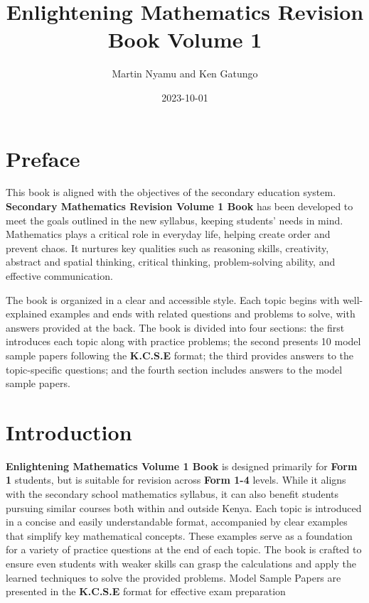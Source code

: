 \documentclass[
  a4paperpaper,
]{scrbook}
\title{Enlightening Mathematics Revision Book Volume 1}
\author{Martin Nyamu and Ken Gatungo}
\date{2023-10-01}
\renewcommand*\contentsname{Table of contents}
\newcommand\contentsname{Table of contents}
\begin{document}
\frontmatter
\maketitle

\renewcommand*\contentsname{Table of contents}
{
\hypersetup{linkcolor=}
\setcounter{tocdepth}{2}
\tableofcontents
}

\mainmatter
{}

\chapter*{Preface}\label{preface}


This book is aligned with the objectives of the secondary education
system. \textbf{Secondary Mathematics Revision Volume 1 Book} has been
developed to meet the goals outlined in the new syllabus, keeping
students' needs in mind. Mathematics plays a critical role in everyday
life, helping create order and prevent chaos. It nurtures key qualities
such as reasoning skills, creativity, abstract and spatial thinking,
critical thinking, problem-solving ability, and effective communication.

The book is organized in a clear and accessible style. Each topic begins
with well-explained examples and ends with related questions and
problems to solve, with answers provided at the back. The book is
divided into four sections: the first introduces each topic along with
practice problems; the second presents 10 model sample papers following
the \textbf{K.C.S.E} format; the third provides answers to the
topic-specific questions; and the fourth section includes answers to the
model sample papers.


\chapter*{Introduction}\label{introduction}


\textbf{Enlightening Mathematics Volume 1 Book} is designed primarily
for \textbf{Form 1} students, but is suitable for revision across
\textbf{Form 1-4} levels. While it aligns with the secondary school
mathematics syllabus, it can also benefit students pursuing similar
courses both within and outside Kenya. Each topic is introduced in a
concise and easily understandable format, accompanied by clear examples
that simplify key mathematical concepts. These examples serve as a
foundation for a variety of practice questions at the end of each topic.
The book is crafted to ensure even students with weaker skills can grasp
the calculations and apply the learned techniques to solve the provided
problems. Model Sample Papers are presented in the \textbf{K.C.S.E}
format for effective exam preparation
\end{document}
